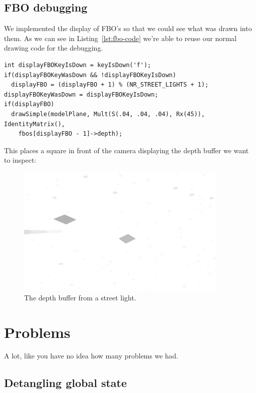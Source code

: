 \documentclass[a4paper,12pt]{article}
\begin{document}
\subsection{FBO debugging}

We implemented the display of FBO's so that we could see what was drawn into them. As we can see in Listing~\ref{lst:fbo-code} we're able to reuse our normal drawing code for the debugging.

\begin{lstlisting}[label=lst:fbo-code,caption= Switching between the FBO's]
int displayFBOKeyIsDown = keyIsDown('f');
if(displayFBOKeyWasDown && !displayFBOKeyIsDown)
  displayFBO = (displayFBO + 1) % (NR_STREET_LIGHTS + 1);
displayFBOKeyWasDown = displayFBOKeyIsDown;
if(displayFBO)
  drawSimple(modelPlane, Mult(S(.04, .04, .04), Rx(45)), IdentityMatrix(),
    fbos[displayFBO - 1]->depth);
\end{lstlisting}

This places a square in front of the camera displaying the depth buffer we want to inspect:

\begin{figure}[ht]
  \centering
  \includegraphics[width=0.9\textwidth]{fbo}
  \caption{\label{fig:fbo-image} The depth buffer from a street light.}
\end{figure}




\section{Problems}

A lot, like you have no idea how many problems we had.

\subsection{Detangling global state}
\end{document}

